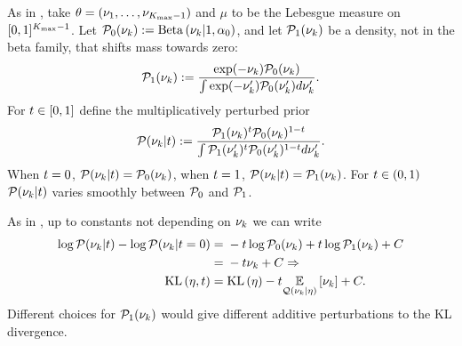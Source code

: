 \begin{ex}
%
As in , take $\theta = (\nu_1, \ldots, \nu_{{K_{\mathrm{max}}}-1})$
and $\mu$ to be the Lebesgue measure on $[0,1]^{{K_{\mathrm{max}}}-1}$. Let $\mathcal{P}_{0}(\nu_{k}) :=
\mathrm{Beta}\left(\nu_{k} \vert 1, \alpha_0\right)$, and let $\mathcal{P}_{1}(\nu_{k})$ be a density, not
in the beta family, that shifts mass towards zero:
%
\begin{align*}
%
\palt(\nuk) :=
    \frac{\exp(-\nuk)\pbase(\nuk)}{\int \exp(-\nuk')\pbase(\nuk') d\nuk'}.
%
\end{align*}
%
For $t \in [0,1]$ define the multiplicatively perturbed prior
%
\begin{align*}
%
\p(\nuk \vert \t) :=
    \frac{\palt(\nuk)^{\t} \pbase(\nuk)^{1-\t}}
         {\int \palt(\nuk')^{\t} \pbase(\nuk')^{1-\t} d\nuk'}.
%
\end{align*}
%
When $t = 0$, $\mathcal{P}(\nu_{k} \vert t) = \mathcal{P}_{0}(\nu_{k})$, when $t = 1$,
$\mathcal{P}(\nu_{k} \vert t)  = \mathcal{P}_{1}(\nu_{k})$.  For $t \in (0,1)$
$\mathcal{P}(\nu_{k} \vert t)$ varies smoothly between $\mathcal{P}_{0}$ and $\mathcal{P}_{1}$.

As in , up to constants not depending on
$\nu_{k}$ we can write
%
\begin{align*}
%
\log \p(\nuk \vert \t) - \log \p(\nuk \vert \t=0) ={}&
    -\t \log \pbase(\nuk) + \t \log \palt(\nuk) + \const
\\={}& -\t \nuk + \const \Rightarrow
\\
\KL{\eta, \t} ={}& \KL{\eta} -\t \expect{\q(\nuk\vert\eta)}{\nuk} + \const.
%
\end{align*}
%
Different choices for $\mathcal{P}_{1}(\nu_{k})$ would give different additive
perturbations to the KL divergence.
%
\end{ex}
%
